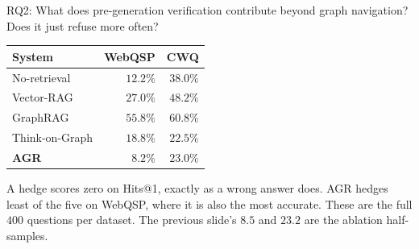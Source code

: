 {%
%
%
\begin{frame}{RQ2: What does pre-generation verification contribute beyond graph navigation?}{Does it just refuse more often?}
  \bodyshift{-0.5pt}
  \begin{table}
    \small
    \renewcommand{\arraystretch}{1.1}
    \begin{tabular}{@{}lrr@{}}
      \toprule
      \textbf{System} & \textbf{WebQSP} & \textbf{CWQ} \\
      \midrule
      No-retrieval    & $12.2\%$ & $38.0\%$ \\
      Vector-RAG      & $27.0\%$ & $48.2\%$ \\
      GraphRAG        & $55.8\%$ & $60.8\%$ \\
      Think-on-Graph  & $18.8\%$ & $22.5\%$ \\
      \textbf{AGR}    & $\mathbf{8.2\%}$ & $23.0\%$ \\
      \bottomrule
    \end{tabular}
  \end{table}
  {\small A hedge scores zero on Hits@1, exactly as a wrong answer does.
  AGR hedges \alert{least of the five} on WebQSP, where it is also the most
  accurate. These are the full $400$ questions per dataset. The previous
  slide's $8.5$ and $23.2$ are the ablation half-samples.\par}
\end{frame}

}%

